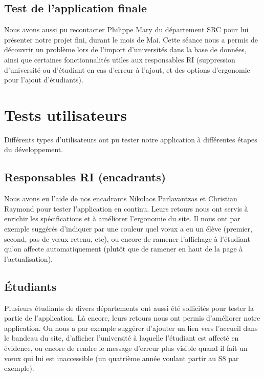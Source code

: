 \subsection{Test de l'application finale}
Nous avons aussi pu recontacter Philippe Mary du département SRC pour lui présenter notre projet fini, durant le mois de Mai. Cette séance nous a permis de découvrir un problème lors de l'import d'universités dans la base de données, ainsi que certaines fonctionnalités utiles aux responsables RI (suppression d'université ou d'étudiant en cas d'erreur à l'ajout, et des options d'ergonomie pour l'ajout d'étudiants). 

\section{Tests utilisateurs}
Différents types d'utilisateurs ont pu tester notre application à différentes étapes du développement.
\subsection{Responsables RI (encadrants)}
Nous avons eu l'aide de nos encadrants Nikolaos Parlavantzas et Christian Raymond pour tester l'application en continu. Leurs retours nous ont servis à enrichir les spécifications et à améliorer l'ergonomie du site. Il nous ont par exemple suggérés d'indiquer par une couleur quel vœux a eu un élève (premier, second, pas de vœux retenu, etc), ou encore de ramener l'affichage à l'étudiant qu'on affecte automatiquement (plutôt que de ramener en haut de la page à l'actualisation).

\subsection{Étudiants}
Plusieurs étudiants de divers départements ont aussi été sollicités pour tester la partie \fg de l'application. Là encore, leurs retours nous ont permis d'améliorer notre application. On nous a par exemple suggérer d'ajouter un lien vers l'accueil dans le bandeau du site, d'afficher l'université à laquelle l'étudiant est affecté en évidence, ou encore de rendre le message d'erreur plus visible quand il fait un vœux qui lui est inaccessible (un quatrième année voulant partir au S8 par exemple).
